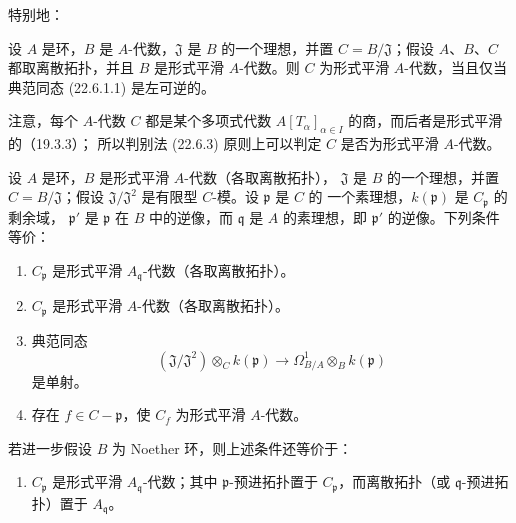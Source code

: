 特别地：

\begin{corollary}[22.6.3]
\label{0.22.6.3-fr}
设 $A$ 是环，$B$ 是 $A$-代数，$\mathfrak J$ 是 $B$ 的一个理想，并置
$C=B/\mathfrak J$；假设 $A$、$B$、$C$ 都取离散拓扑，并且 $B$ 是形式平滑
$A$-代数。则 $C$ 为形式平滑 $A$-代数，当且仅当典范同态 (22.6.1.1)
是左可逆的。
\end{corollary}

注意，每个 $A$-代数 $C$ 都是某个多项式代数
$A[T_\alpha]_{\alpha\in I}$ 的商，而后者是形式平滑的（19.3.3）；
所以判别法 (22.6.3) 原则上可以判定 $C$ 是否为形式平滑 $A$-代数。

\begin{proposition}[22.6.4]
\label{0.22.6.4-fr}
设 $A$ 是环，$B$ 是形式平滑 $A$-代数（各取离散拓扑），
$\mathfrak J$ 是 $B$ 的一个理想，并置 $C=B/\mathfrak J$；假设
$\mathfrak J/\mathfrak J^2$ 是有限型 $C$-模。设 $\mathfrak p$ 是 $C$ 的
一个素理想，$k(\mathfrak p)$ 是 $C_{\mathfrak p}$ 的剩余域，
$\mathfrak p'$ 是 $\mathfrak p$ 在 $B$ 中的逆像，而 $\mathfrak q$ 是
$A$ 的素理想，即 $\mathfrak p'$ 的逆像。下列条件等价：
\begin{enumerate}
  \item[a)] $C_{\mathfrak p}$ 是形式平滑
  $A_{\mathfrak q}$-代数（各取离散拓扑）。
  \item[a')] $C_{\mathfrak p}$ 是形式平滑 $A$-代数（各取离散拓扑）。
  \item[b)] 典范同态
  \begin{equation}
  \label{0.22.6.4.1-fr}
    (\mathfrak J/\mathfrak J^2)\otimes_Ck(\mathfrak p)
    \longrightarrow\Omega^1_{B/A}\otimes_Bk(\mathfrak p)
    \tag{22.6.4.1}
  \end{equation}
  是单射。
  \item[c)] 存在 $f\in C-\mathfrak p$，使 $C_f$ 为形式平滑 $A$-代数。
\end{enumerate}
若进一步假设 $B$ 为 Noether 环，则上述条件还等价于：
\begin{enumerate}
  \item[d)] $C_{\mathfrak p}$ 是形式平滑 $A_{\mathfrak q}$-代数；其中
  $\mathfrak p$-预进拓扑置于 $C_{\mathfrak p}$，而离散拓扑（或
  $\mathfrak q$-预进拓扑）置于 $A_{\mathfrak q}$。
\end{enumerate}
\end{proposition}

